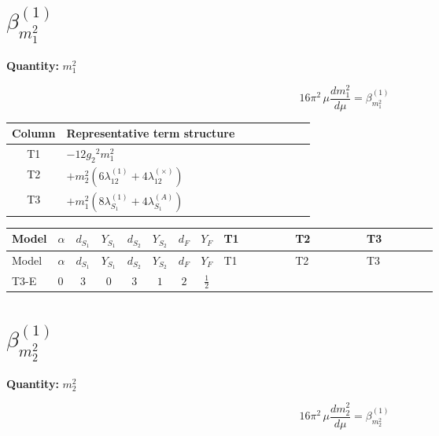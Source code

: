 \documentclass[8pt]{article}
\begin{document}
\begin{landscape}
\section*{$\beta_{m_1^2}^{(1)}$}
\noindent\textbf{Quantity: }$m_1^2$\par\smallskip
\[16\pi^2\,\mu\frac{d m_1^2}{d\mu}=\beta_{m_1^2}^{(1)}\]
\begin{center}
\begin{tabular}{@{}c >{\raggedright\arraybackslash}p{0.82\linewidth}@{}}
\toprule
Column & Representative term structure \\
\midrule
T1 & \(\displaystyle -12 {g_2}^2 {m_1^2}\) \\
\midrule
T2 & \(\displaystyle +{m_2^2} (6 {\lambda_{12}^{(1)}}+4 {\lambda_{12}^{(\times)}})\) \\
\midrule
T3 & \(\displaystyle +{m_1^2} (8 {\lambda_{S_1}^{(1)}}+4 {\lambda_{S_1}^{(A)}})\) \\
\midrule
\bottomrule
\end{tabular}
\end{center}
\smallskip
\tiny
\begin{longtable}{@{}llcccccc >{\raggedright\arraybackslash}p{0.21\linewidth} >{\raggedright\arraybackslash}p{0.21\linewidth} >{\raggedright\arraybackslash}p{0.21\linewidth}@{}}
\toprule
Model & $\alpha$ & $d_{S_1}$ & $Y_{S_1}$ & $d_{S_2}$ & $Y_{S_2}$ & $d_F$ & $Y_F$ & T1 & T2 & T3 \\
\midrule
\endfirsthead
\toprule
Model & $\alpha$ & $d_{S_1}$ & $Y_{S_1}$ & $d_{S_2}$ & $Y_{S_2}$ & $d_F$ & $Y_F$ & T1 & T2 & T3 \\
\midrule
\endhead
T3-E & $0$ & $3$ & $0$ & $3$ & $1$ & $2$ & $\frac{1}{2}$ & \scriptsize\adjustbox{max width=\linewidth}{$\begin{gathered} -12 {g_2}^2 {m_1^2}\end{gathered}$} & \scriptsize\adjustbox{max width=\linewidth}{$\begin{gathered} +{m_2^2} (6 {\lambda_{12}^{(1)}}+4 {\lambda_{12}^{(\times)}})\end{gathered}$} & \scriptsize\adjustbox{max width=\linewidth}{$\begin{gathered} +{m_1^2} (8 {\lambda_{S_1}^{(1)}}+4 {\lambda_{S_1}^{(A)}})\end{gathered}$} \\
\midrule
\bottomrule
\end{longtable}
\clearpage
\section*{$\beta_{m_2^2}^{(1)}$}
\noindent\textbf{Quantity: }$m_2^2$\par\smallskip
\[16\pi^2\,\mu\frac{d m_2^2}{d\mu}=\beta_{m_2^2}^{(1)}\]

\end{landscape}
\end{document}
